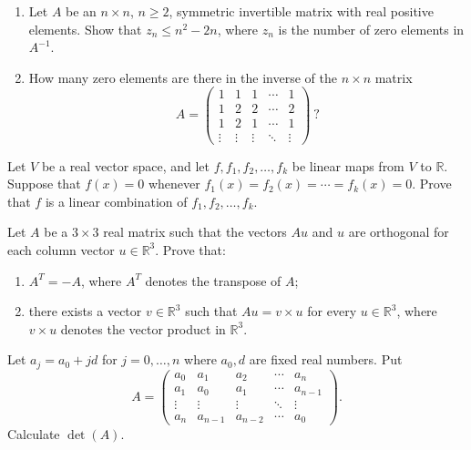 \documentclass[12pt]{article}
\begin{document}
\begin{problem}
\begin{enumerate}[label=(\alph*)]
\item Let $A$ be an $n\times n$, $n\ge 2$, symmetric invertible matrix with real positive elements. Show that $z_n \le n^2-2n$, where $z_n$ is the number of zero elements in $A^{-1}$.
\item How many zero elements are there in the inverse of the $n\times n$ matrix
\[
A = \begin{pmatrix}
1 & 1 & 1 & \cdots & 1\\
1 & 2 & 2 & \cdots & 2\\
1 & 2 & 1 & \cdots & 1\\
\vdots & \vdots & \vdots & \ddots & \vdots
\end{pmatrix}\ ?
\]
\end{enumerate}
\end{problem}

\begin{problem}
Let $V$ be a real vector space, and let $f,f_1,f_2,\dots,f_k$ be linear maps from $V$ to $\mathbb{R}$. Suppose that $f(x)=0$ whenever $f_1(x)=f_2(x)=\cdots=f_k(x)=0$. Prove that $f$ is a linear combination of $f_1,f_2,\dots,f_k$.
\end{problem}

\begin{problem}
Let $A$ be a $3\times 3$ real matrix such that the vectors $Au$ and $u$ are orthogonal for each column vector $u\in\mathbb{R}^3$. Prove that:
\begin{enumerate}[label=(\alph*)]
\item $A^T=-A$, where $A^T$ denotes the transpose of $A$;
\item there exists a vector $v\in\mathbb{R}^3$ such that $Au = v\times u$ for every $u\in\mathbb{R}^3$, where $v\times u$ denotes the vector product in $\mathbb{R}^3$.
\end{enumerate}
\end{problem}

\begin{problem}
Let $a_j=a_0+jd$ for $j=0,\dots,n$ where $a_0,d$ are fixed real numbers. Put
\[
A = \begin{pmatrix}
a_0 & a_1 & a_2 & \cdots & a_n\\
a_1 & a_0 & a_1 & \cdots & a_{n-1}\\
\vdots & \vdots & \vdots & \ddots & \vdots\\
a_n & a_{n-1} & a_{n-2} & \cdots & a_0
\end{pmatrix}.
\]
Calculate $\det(A)$.
\end{problem}
\end{document}
